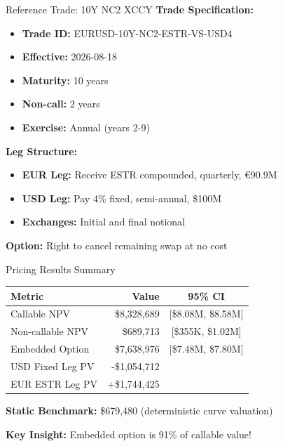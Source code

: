 \documentclass[aspectratio=169,11pt]{beamer}
\begin{document}
\begin{frame}{Reference Trade: 10Y NC2 XCCY}
\textbf{Trade Specification:}
\begin{itemize}
    \item \textbf{Trade ID:} EURUSD-10Y-NC2-ESTR-VS-USD4
    \item \textbf{Effective:} 2026-08-18
    \item \textbf{Maturity:} 10 years
    \item \textbf{Non-call:} 2 years
    \item \textbf{Exercise:} Annual (years 2-9)
\end{itemize}

\textbf{Leg Structure:}
\begin{itemize}
    \item \textbf{EUR Leg:} Receive ESTR compounded, quarterly, €90.9M
    \item \textbf{USD Leg:} Pay 4\% fixed, semi-annual, \$100M
    \item \textbf{Exchanges:} Initial and final notional
\end{itemize}

\textbf{Option:} Right to cancel remaining swap at no cost
\end{frame}

\begin{frame}{Pricing Results Summary}
\begin{center}
\begin{tabular}{lrc}
\toprule
\textbf{Metric} & \textbf{Value} & \textbf{95\% CI} \\
\midrule
Callable NPV & \$8,328,689 & [\$8.08M, \$8.58M] \\
Non-callable NPV & \$689,713 & [\$355K, \$1.02M] \\
Embedded Option & \$7,638,976 & [\$7.48M, \$7.80M] \\
\midrule
USD Fixed Leg PV & -\$1,054,712 & \\
EUR ESTR Leg PV & +\$1,744,425 & \\
\bottomrule
\end{tabular}
\end{center}

\textbf{Static Benchmark:} \$679,480 (deterministic curve valuation)

\vspace{0.3cm}
\textbf{Key Insight:} Embedded option is 91\% of callable value!
\end{frame}
\end{document}
